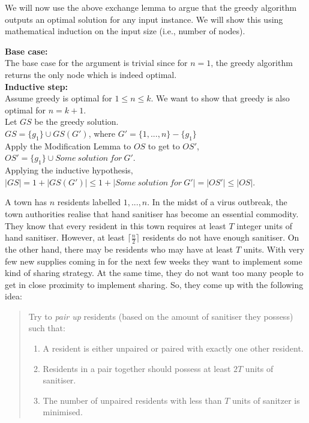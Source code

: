 \documentclass{exam}
\begin{document}
\begin{questions}
We will now use the above exchange lemma to argue that the greedy algorithm outputs an optimal solution for any input instance. 
We will show this using mathematical induction on the input size (i.e., number of nodes). 

{\bf Base case:}\\
The base case for the argument is trivial since for $n=1$, the greedy algorithm returns the only node which is indeed optimal.\\

{\bf Inductive step:}\\
Assume greedy is optimal for $1\leq n\leq k$. We want to show that greedy is also optimal for $n=k+1$.\\
Let $GS$ be the greedy solution.\\
$GS=\{g_1\}\cup GS(G')$, where $G'=\{1, ..., n\}-\{g_1\}$\\
Apply the Modification Lemma to $OS$ to get to $OS'$,\\
$OS'=\{g_1\}\cup Some\:solution\:for\:G'$.\\
Applying the inductive hypothesis,\\
$|GS|=1+|GS(G')|\leq 1+|Some\:solution\:for\:G'|=|OS'|\leq|OS|$.


\vspace{0.4in}


\question[25] A town has $n$ residents labelled $1, ..., n$. In the midst of a virus outbreak, the town authorities realise that hand sanitiser has become an essential commodity. 
They know that every resident in this town requires at least $T$ integer units of hand sanitiser. 
However, at least $\lceil \frac{n}{2}\rceil$ residents do not have enough sanitiser. 
On the other hand, there may be residents who may have at least $T$ units. 
With very few new supplies coming in for the next few weeks they want to implement some kind of sharing strategy. 
At the same time, they do not want too many people to get in close proximity to implement sharing. So, they come up with the following idea:
\begin{quote}
Try to {\em pair up} residents (based on the amount of sanitiser they possess) such that: 
\begin{enumerate}
\item A resident is either unpaired or paired with exactly one other resident. 
\item Residents in a pair together should possess at least $2T$ units of sanitiser.
\item The number of unpaired residents with less than $T$ units of sanitzer is minimised.
\end{enumerate}
\end{quote}


\end{questions}
\end{document}
